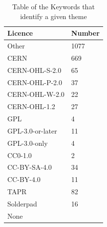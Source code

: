 \documentclass[final-report.tex]{subfiles}
\begin{document}
\begin{table}[ht]
        \centering
        \begin{tabular}{| l | l |}
        \toprule
                Licence & Number \\
        \midrule
            Other & 1077 \\
            CERN & 669 \\
            CERN-OHL-S-2.0 & 65 \\
            CERN-OHL-P-2.0 & 37 \\
            CERN-OHL-W-2.0 & 22 \\
            CERN-OHL-1.2 & 27 \\
            GPL & 4 \\
            GPL-3.0-or-later & 11 \\
            GPL-3.0-only & 4 \\
            CC0-1.0 & 2 \\
            CC-BY-SA-4.0 & 34 \\
            CC-BY-4.0 & 11 \\
            TAPR & 82 \\
            Solderpad & 16 \\
            None &  \\
        \bottomrule
        \end{tabular}
        \caption{Table of the Keywords that identify a given theme}
        \label{tab:keywords}
\end{table}
\end{document}
